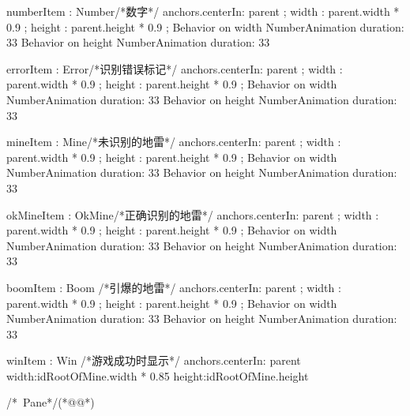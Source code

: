\begin{thebookfilesourceone}[escapeinside={(*@}{@*)},
caption=GoodLuck,
title=\filesourcenumbernameone \thefilesourcenumber
]
{{        numberItem : Number{/*数字*/
            anchors.centerIn: parent ;
            width  : parent.width * 0.9 ;
            height : parent.height * 0.9 ;
            Behavior on width{
                NumberAnimation{
                    duration: 33
                }
            }
            Behavior on height{
                NumberAnimation{
                    duration: 33
                }
            }
        }

        errorItem : Error{/*识别错误标记*/
            anchors.centerIn: parent ;
            width  : parent.width * 0.9 ;
            height : parent.height * 0.9 ;
            Behavior on width{
                NumberAnimation{
                    duration: 33
                }
            }
            Behavior on height{
                NumberAnimation{
                    duration: 33
                }
            }
        }

        mineItem : Mine{/*未识别的地雷*/
            anchors.centerIn: parent ;
            width  : parent.width * 0.9 ;
            height : parent.height * 0.9 ;
            Behavior on width{
                NumberAnimation{
                    duration: 33
                }
            }
            Behavior on height{
                NumberAnimation{
                    duration: 33
                }
            }
        }

        okMineItem : OkMine{/*正确识别的地雷*/
            anchors.centerIn: parent ;
            width  : parent.width * 0.9 ;
            height : parent.height * 0.9 ;
            Behavior on width{
                NumberAnimation{
                    duration: 33
                }
            }
            Behavior on height{
                NumberAnimation{
                    duration: 33
                }
            }
        }

        boomItem : Boom {/*引爆的地雷*/
            anchors.centerIn: parent ;
            width  : parent.width * 0.9 ;
            height : parent.height * 0.9 ;
            Behavior on width{
                NumberAnimation{
                    duration: 33
                }
            }
            Behavior on height{
                NumberAnimation{
                    duration: 33
                }
            }
        }

        winItem : Win {/*游戏成功时显示*/
            anchors.centerIn: parent
            width:idRootOfMine.width * 0.85
            height:idRootOfMine.height
        }

    }

}/*~Pane*/(*@\marginpar[\hfill\setlength\fboxsep{2pt}\fbox{\footnotesize{\kaishu\parbox{1em}{\setlength{\baselineskip}{2pt}\filesourcenumbernameone}}\footnotesize{\thefilesourcenumber}}]{\setlength\fboxsep{2pt}\fbox{\footnotesize{\kaishu\parbox{1em}{\setlength{\baselineskip}{2pt}\filesourcenumbernameone}}\footnotesize{\thefilesourcenumber}}}@*)\end{thebookfilesourceone}          %
\addtocounter{lstlisting}{-1}   %


